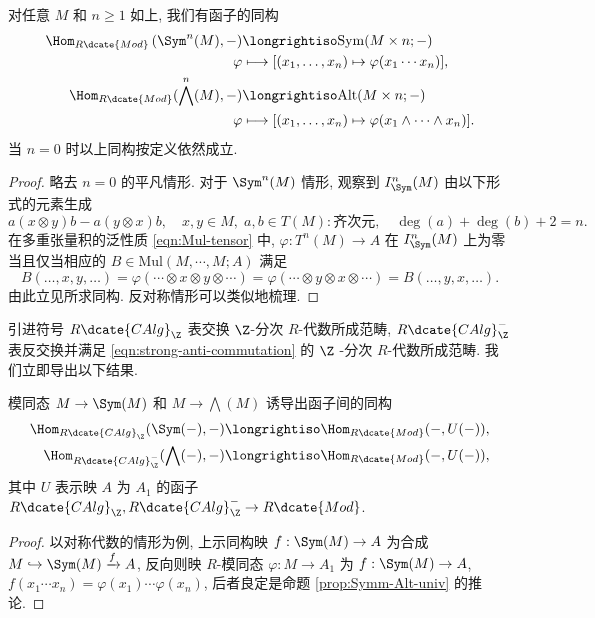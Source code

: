 \begin{proposition}\label{prop:Symm-Alt-univ}
	对任意 $M$ 和 $n \geq 1$ 如上, 我们有函子的同构
	\begin{align*}
		\Hom_{R\dcate{Mod}}\left( \Sym^n(M), - \right) & \longrightiso \mathrm{Sym}(M \times n; -) \\
		\varphi & \longmapsto [(x_1, \ldots, x_n) \mapsto \varphi(x_1 \cdots x_n)], \\
		\Hom_{R\dcate{Mod}}(\bigwedge^n(M), - ) & \longrightiso \mathrm{Alt}(M \times n; -) \\
		\varphi & \longmapsto [(x_1, \ldots, x_n) \mapsto \varphi(x_1 \wedge \cdots \wedge x_n)].
	\end{align*}
	当 $n=0$ 时以上同构按定义依然成立.
\end{proposition}
\begin{proof}
	略去 $n=0$ 的平凡情形. 对于 $\Sym^n(M)$ 情形, 观察到 $I^n_{\Sym}(M)$ 由以下形式的元素生成
	\[ a(x \otimes y )b- a(y \otimes x)b, \quad x,y \in M, \; a,b \in T(M): \text{齐次元}, \quad \deg(a)+\deg(b)+2=n. \]
	在多重张量积的泛性质 \eqref{eqn:Mul-tensor} 中, $\varphi: T^n(M) \to A$ 在 $I^n_{\Sym}(M)$ 上为零当且仅当相应的 $B \in \text{Mul}(M, \cdots, M; A)$ 满足
	\[ B(\ldots, x, y, \ldots) = \varphi(\cdots \otimes x \otimes y \otimes \cdots) = \varphi(\cdots \otimes y \otimes x \otimes \cdots) = B(\ldots, y, x, \ldots). \]
	由此立见所求同构. 反对称情形可以类似地梳理.
\end{proof}

引进符号 $R\dcate{CAlg}_\Z$ 表交换 $\Z$-分次 $R$-代数所成范畴, $R\dcate{CAlg}^-_\Z$ 表反交换并满足 \eqref{eqn:strong-anti-commutation} 的 $\Z$ -分次 $R$-代数所成范畴. 我们立即导出以下结果.
\begin{theorem}\label{prop:Sym-wedge-universal}
	模同态 $M \to \Sym(M)$ 和 $M \to \bigwedge(M)$ 诱导出函子间的同构
	\begin{align*}
		\Hom_{R\dcate{CAlg}_\Z}(\Sym(-),-) & \longrightiso \Hom_{R\dcate{Mod}}(-, U(-)), \\
		\Hom_{R\dcate{CAlg}^-_\Z}(\bigwedge(-),-) & \longrightiso \Hom_{R\dcate{Mod}}(-, U(-)),
	\end{align*}
	其中 $U$ 表示映 $A$ 为 $A_1$ 的函子 $R\dcate{CAlg}_\Z, R\dcate{CAlg}^-_\Z \to R\dcate{Mod}$.
\end{theorem}
\begin{proof}
	以对称代数的情形为例, 上示同构映 $f: \Sym(M) \to A$ 为合成 $M \hookrightarrow \Sym(M) \xrightarrow{f} A$, 反向则映 $R$-模同态 $\varphi: M \to A_1$ 为 $f: \Sym(M) \to A$, $f(x_1 \cdots x_n) = \varphi(x_1) \cdots \varphi(x_n)$, 后者良定是命题 \ref{prop:Symm-Alt-univ} 的推论.
\end{proof}

